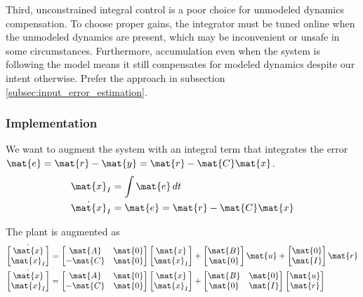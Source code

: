 Third, unconstrained integral control is a poor choice for unmodeled dynamics
compensation. To choose proper gains, the integrator must be tuned online when
the unmodeled dynamics are present, which may be inconvenient or unsafe in some
circumstances. Furthermore, accumulation even when the system is following the
model means it still compensates for modeled dynamics despite our intent
otherwise. Prefer the approach in subsection
\ref{subsec:input_error_estimation}.

\subsubsection{Implementation}

We want to augment the \gls{system} with an integral term that integrates the
\gls{error} $\mat{e} = \mat{r} - \mat{y} = \mat{r} - \mat{C}\mat{x}$.
\begin{align*}
  \mat{x}_I &= \int \mat{e} \,dt \\
  \dot{\mat{x}}_I &= \mat{e} = \mat{r} - \mat{C}\mat{x}
\end{align*}

The \gls{plant} is augmented as
\begin{align*}
  \dot{\begin{bmatrix}
    \mat{x} \\
    \mat{x}_I
  \end{bmatrix}} &=
  \begin{bmatrix}
    \mat{A} & \mat{0} \\
    -\mat{C} & \mat{0}
  \end{bmatrix}
  \begin{bmatrix}
    \mat{x} \\
    \mat{x}_I
  \end{bmatrix} +
  \begin{bmatrix}
    \mat{B} \\
    \mat{0}
  \end{bmatrix}
  \mat{u} +
  \begin{bmatrix}
    \mat{0} \\
    \mat{I}
  \end{bmatrix}
  \mat{r} \\
  \dot{\begin{bmatrix}
    \mat{x} \\
    \mat{x}_I
  \end{bmatrix}} &=
  \begin{bmatrix}
    \mat{A} & \mat{0} \\
    -\mat{C} & \mat{0}
  \end{bmatrix}
  \begin{bmatrix}
    \mat{x} \\
    \mat{x}_I
  \end{bmatrix} +
  \begin{bmatrix}
    \mat{B} & \mat{0} \\
    \mat{0} & \mat{I}
  \end{bmatrix}
  \begin{bmatrix}
    \mat{u} \\
    \mat{r}
  \end{bmatrix}
\end{align*}

